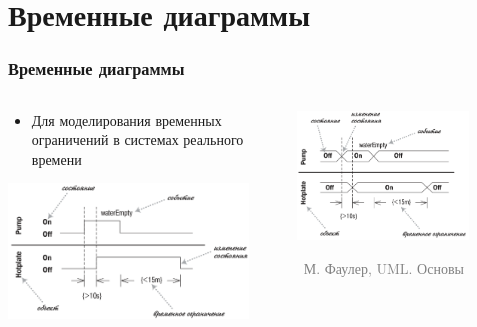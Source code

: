 \documentclass[xetex,mathserif,serif]{beamer}
\newcommand{\attribution}[1] {
	\vspace{-5mm}\begin{flushright}\begin{scriptsize}\textcolor{gray}{\textcopyright\, #1}\end{scriptsize}\end{flushright}
}
\begin{document}
	\section{Временные диаграммы}

	\begin{frame}
		\frametitle{Временные диаграммы}
		\begin{columns}
			\begin{column}{0.5\textwidth}
				\begin{itemize}
					\item Для моделирования временных ограничений в системах реального времени
				\end{itemize}
				\vspace{3mm}
				\begin{center}
					\includegraphics[width=0.9\textwidth]{timingDiagrams.png}
				\end{center}
			\end{column}
			\begin{column}{0.5\textwidth}
				\begin{center}
					\includegraphics[width=0.8\textwidth]{timingDiagramsAlternate.png}
					\attribution{М. Фаулер, UML. Основы}
				\end{center}
			\end{column}
		\end{columns}
	\end{frame}
\end{document}
